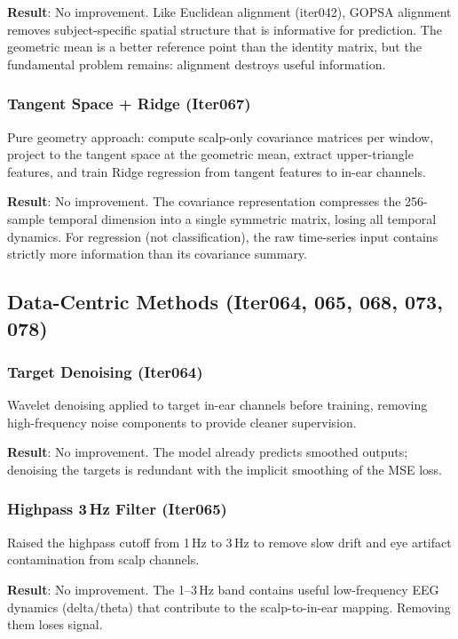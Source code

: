 \documentclass[11pt,a4paper]{article}
\begin{document}
\textbf{Result}: No improvement. Like Euclidean alignment (iter042), GOPSA
alignment removes subject-specific spatial structure that is informative
for prediction. The geometric mean is a better reference point than the
identity matrix, but the fundamental problem remains: alignment destroys
useful information.

\subsubsection{Tangent Space + Ridge (Iter067)}

Pure geometry approach: compute scalp-only covariance matrices per window,
project to the tangent space at the geometric mean, extract upper-triangle
features, and train Ridge regression from tangent features to in-ear
channels.

\textbf{Result}: No improvement. The covariance representation compresses
the 256-sample temporal dimension into a single symmetric matrix, losing
all temporal dynamics. For regression (not classification), the raw
time-series input contains strictly more information than its covariance
summary.

\subsection{Data-Centric Methods (Iter064, 065, 068, 073, 078)}

\subsubsection{Target Denoising (Iter064)}

Wavelet denoising applied to target in-ear channels before training,
removing high-frequency noise components to provide cleaner supervision.

\textbf{Result}: No improvement. The model already predicts smoothed
outputs; denoising the targets is redundant with the implicit smoothing
of the MSE loss.

\subsubsection{Highpass 3\,Hz Filter (Iter065)}

Raised the highpass cutoff from 1\,Hz to 3\,Hz to remove slow drift and
eye artifact contamination from scalp channels.

\textbf{Result}: No improvement. The 1--3\,Hz band contains useful
low-frequency EEG dynamics (delta/theta) that contribute to the
scalp-to-in-ear mapping. Removing them loses signal.
\end{document}
